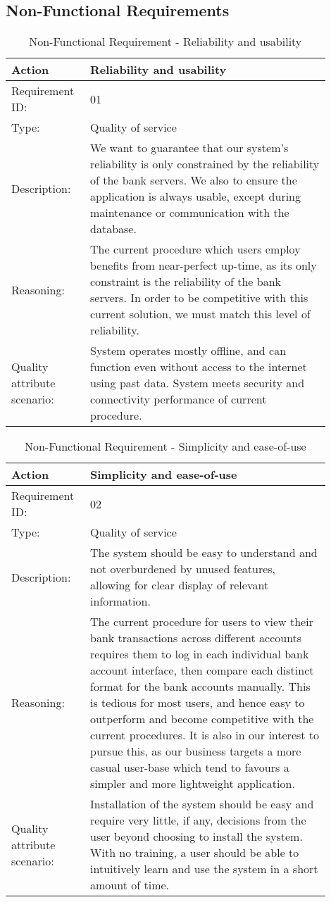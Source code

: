 \documentclass[11pt]{article}
\newcounter{use case ID}
\newcommand\addrow[2]{#1 & #2\\ \hline}
\newcounter{req ID}
\newcommand\tabularheadfsd[1]{
\begin{table}[ht]
    \addtocounter{req ID}{1}
    \caption{Non-Functional Requirement \arabic{req ID} - #1}
    \vspace{0.2cm}
    \begin{tabular}{|p{0.2\linewidth}|p{0.70\linewidth}|}
    \hline
        \textbf{Action} & \textbf{#1} \\
        \hline}
\newenvironment{requirement}{\tabularheadfsd}
{\hline\end{tabular}\end{table}}
\begin{document}
\subsection{Non-Functional Requirements}
\begin{requirement}{Reliability and usability}
    \addrow{Requirement ID:}{01}
    \addrow{Type:}{Quality of service}
    \addrow{Description:}{We want to guarantee that our system's reliability is only constrained by the reliability of the bank servers. We also to ensure the application is always usable, except during maintenance or communication with the database.}
    \addrow{Reasoning:}{The current procedure which users employ benefits from near-perfect up-time, as its only constraint is the reliability of the bank servers. In order to be competitive with this current solution, we must match this level of reliability.}
    \addrow{Quality attribute scenario:}{System operates mostly offline, and can function even without access to the internet using past data. System meets security and connectivity performance of current procedure.}
\end{requirement}

\begin{requirement}{Simplicity and ease-of-use}
    \addrow{Requirement ID:}{02}
    \addrow{Type:}{Quality of service}
    \addrow{Description:}{The system should be easy to understand and not overburdened by unused features, allowing for clear display of relevant information.}
    \addrow{Reasoning:}{The current procedure for users to view their bank transactions across different accounts requires them to log in each individual bank account interface, then compare each distinct format for the bank accounts manually. This is tedious for most users, and hence easy to outperform and become competitive with the current procedures. It is also in our interest to pursue this, as our business targets a more casual user-base which tend to favours a simpler and more lightweight application.}
    \addrow{Quality attribute scenario:}{Installation of the system should be easy and require very little, if any, decisions from the user beyond choosing to install the system. With no training, a user should be able to intuitively learn and use the system in a short amount of time.}
\end{requirement}
\end{document}
